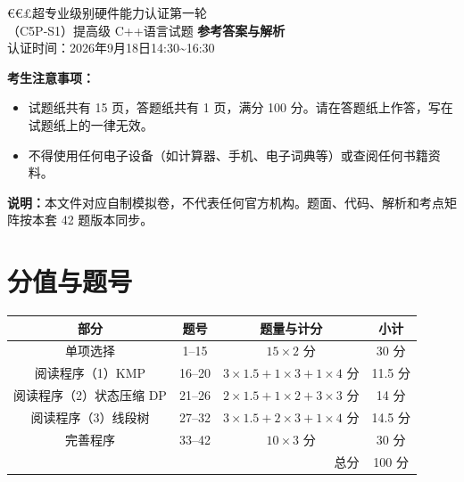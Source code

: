 \documentclass[a4paper]{ctexart}
\begin{document}
\begin{center}
{\dengxian
{\fontsize{15.95}{1} €€£超专业级别硬件能力认证第一轮}\\[1em]
{\fontsize{14.05}{1}\selectfont （C5P-S1）提高级 C++语言试题 \textbf{参考答案与解析}}\\[1em]
{\fontsize{12}{1}\selectfont 认证时间：2026年9月18日14:30\textasciitilde16:30}
}
\end{center}

\vspace{6pt}
\noindent\textbf{考生注意事项：}
\begin{itemize}
  \item 试题纸共有 15 页，答题纸共有 1 页，满分 100 分。请在答题纸上作答，写在试题纸上的一律无效。
  \item 不得使用任何电子设备（如计算器、手机、电子词典等）或查阅任何书籍资料。
\end{itemize}

\noindent\textbf{说明：}本文件对应自制模拟卷，不代表任何官方机构。题面、代码、解析和考点矩阵按本套 42 题版本同步。

\section*{分值与题号}
\begin{center}
\begin{tabular}{c c c c}
\toprule
部分 & 题号 & 题量与计分 & 小计\\
\midrule
单项选择 & 1--15 & $15\times2$ 分 & 30 分\\
阅读程序（1）KMP & 16--20 & $3\times1.5+1\times3+1\times4$ 分 & 11.5 分\\
阅读程序（2）状态压缩 DP & 21--26 & $2\times1.5+1\times2+3\times3$ 分 & 14 分\\
阅读程序（3）线段树 & 27--32 & $3\times1.5+2\times3+1\times4$ 分 & 14.5 分\\
完善程序 & 33--42 & $10\times3$ 分 & 30 分\\
\midrule
\multicolumn{3}{r}{总分} & 100 分\\
\bottomrule
\end{tabular}
\end{center}
\end{document}
